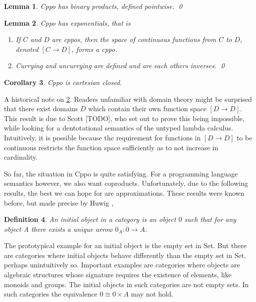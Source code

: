 \documentclass[a4paper]{article}
\newcommand{\arr}{\rightarrow}
\newcommand{\product}{\!\times\!}
\newtheorem{definition}{Definition}[section]
\newtheorem{lemma}[definition]{Lemma}
\newtheorem{corollary}[definition]{Corollary}
\begin{document}
\begin{lemma} \label{lemCppoBinaryProducts}
Cppo has binary products, defined pointwise. \qed
\end{lemma}

\begin{lemma} \label{lemCppoExponentials}
Cppo has exponentials, that is
\begin{enumerate}[noitemsep]
  \item If $C$ and $D$ are cppos, then the space of continuous functions from
  $C$ to $D$, denoted $[C \arr D]$, forms a cppo.
  \item Currying and uncurrying are defined and are each others inverses. \qed
\end{enumerate}
\end{lemma}

\begin{corollary}
Cppo is cartesian closed.
\end{corollary}

A historical note on \ref{lemCppoExponentials}. Readers unfamiliar with domain
theory might be surprised that there exist domains $D$ which contain their own
function space $[D \arr D]$.  This result is due to Scott [TODO], who set out to
prove this being impossible, while looking for a dentotational semantics of
the untyped lambda calculus. Intuitively, it is possible because the
requirement for functions in $[D \arr D]$ to be continuous restricts the
function space sufficiently as to not increase in cardinality.

So far, the situation in Cppo is quite satisfying. For a programming language
semantics however, we also want coproducts. Unfortunately, due to the following
results, the best we can hope for are approximations.  These results were known
before, but made precise by Huwig \cite{Huwig1990},

\begin{definition}
An \emph{initial object} in a category is an object $0$ such that for any object
A there exists a unique arrow $0_A : 0 \arr A$.
\end{definition}

The prototypical example for an initial object is the empty set in Set. But
there are categories where initial objects behave differently than the empty set
in Set, perhaps unintuitively so. Important examples are categories where
objects are algebraic structures whose signature requires the existence of
elements, like monoids and groups. The initial objects in such categories are
not empty sets. In such categories the equivalence $0 \cong 0 \product A$ may
not hold.
\end{document}
